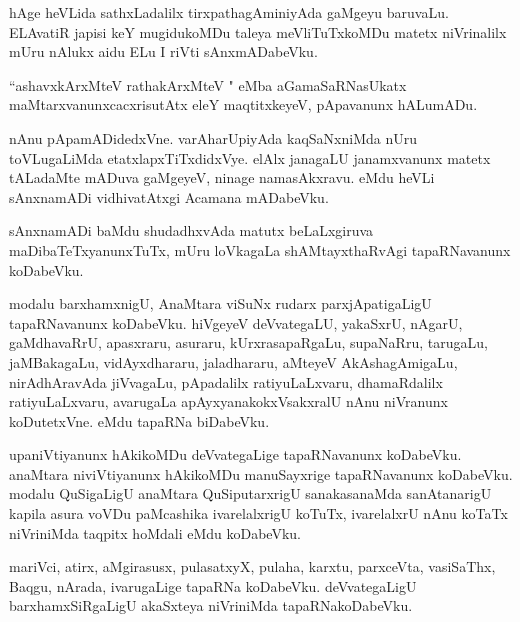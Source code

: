 \documentclass{article}
\begin{document}
\begin{mn}
hAge  heVLida  sathxLadalilx    tirxpathagAminiyAda  gaMgeyu  baruvaLu.  ELAvatiR  japisi  keY 
mugidukoMDu  taleya  meVliTuTxkoMDu  matetx  niVrinalilx  mUru  nAlukx  aidu  ELu  I riVti  sAnxmADabeVku.
\end{mn}

\begin{mn}
``ashavxkArxMteV  rathakArxMteV " eMba  aGamaSaRNasUkatx  maMtarxvanunxcacxrisutAtx  
eleY  maqtitxkeyeV,  pApavanunx  hALumADu.
\end{mn}

\begin{mn}
nAnu  pApamADidedxVne.  varAharUpiyAda  kaqSaNxniMda  nUru  toVLugaLiMda  etatxlapxTiTxdidxVye.  
elAlx  janagaLU  janamxvanunx  matetx  tALadaMte  mADuva  gaMgeyeV,  ninage  namasAkxravu.  
eMdu  heVLi  sAnxnamADi  vidhivatAtxgi  Acamana mADabeVku.
\end{mn}

\begin{mn}
sAnxnamADi  baMdu  shudadhxvAda  matutx  beLaLxgiruva  maDibaTeTxyanunxTuTx,  mUru  loVkagaLa  
shAMtayxthaRvAgi  tapaRNavanunx  koDabeVku.
\end{mn}

\begin{mn}
modalu  barxhamxnigU,  AnaMtara  viSuNx  rudarx  parxjApatigaLigU  tapaRNavanunx  koDabeVku.  
hiVgeyeV  deVvategaLU,  yakaSxrU,  nAgarU,  gaMdhavaRrU,  apasxraru,  asuraru,  kUrxrasapaRgaLu,  
supaNaRru,  tarugaLu,  jaMBakagaLu,  vidAyxdhararu,  jaladhararu,  aMteyeV  AkAshagAmigaLu,  
nirAdhAravAda  jiVvagaLu,  pApadalilx  ratiyuLaLxvaru,  dhamaRdalilx  ratiyuLaLxvaru,  avarugaLa  
apAyxyanakokxVsakxralU  nAnu  niVranunx  koDutetxVne.  eMdu  tapaRNa  biDabeVku.
\end{mn}

\begin{mn}
upaniVtiyanunx  hAkikoMDu  deVvategaLige  tapaRNavanunx  koDabeVku.  anaMtara  niviVtiyanunx  
hAkikoMDu  manuSayxrige  tapaRNavanunx  koDabeVku.  modalu  QuSigaLigU  anaMtara  QuSiputarxrigU  
sanakasanaMda  sanAtanarigU  kapila  asura  voVDu  paMcashika  ivarelalxrigU  koTuTx,  
ivarelalxrU  nAnu  koTaTx  niVriniMda  taqpitx  hoMdali  eMdu  koDabeVku.
\end{mn}

\begin{mn}
mariVci,  atirx,  aMgirasusx,  pulasatxyX,  pulaha,  karxtu,  parxceVta,  vasiSaThx,  
Baqgu,  nArada,  ivarugaLige  tapaRNa koDabeVku.  deVvategaLigU  barxhamxSiRgaLigU  
akaSxteya  niVriniMda  tapaRNakoDabeVku.
\end{mn}
\end{document}
